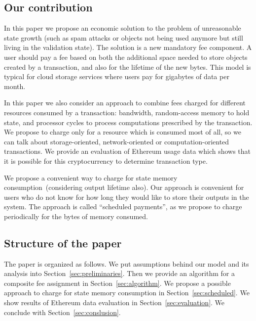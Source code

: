 \documentclass[]{llncs}   %
\begin{document}
\subsection{Our contribution}

In this paper we propose an economic solution to the problem of unreasonable state growth
(such as spam attacks or objects not being used anymore but still living in
the validation state). The solution is a new mandatory fee component. A 
user should pay a fee based on both the additional space needed to store objects
created by a transaction, and also for  the lifetime of the new bytes. This model is
typical for cloud storage services where users pay for gigabytes of data per
month. 

In this paper we also consider an approach to combine fees charged for different resources consumed by a transaction:
bandwidth, random-access memory to hold state, and processor cycles to process computations prescribed by the transaction.    
We propose to charge only for a resource which is consumed most of all, so we can talk about storage-oriented,
network-oriented or computation-oriented transactions. We provide an evaluation of Ethereum usage data which shows
that it is possible for this cryptocurrency to determine transaction type.

We propose a convenient way to charge for state memory consumption~(considering output lifetime also).
Our approach is convenient for users who do not know for how long they would like to store their
outputs in the system. The approach is called ``scheduled payments'', as we propose to charge periodically
for the bytes of memory consumed.






\subsection{Structure of the paper}
The paper is organized as follows. We put assumptions behind our model and its analysis into Section~\ref{sec:preliminaries}. Then we provide an algorithm for a composite fee assignment in Section~\ref{sec:algorithm}. We propose a possible approach to charge for state memory consumption in Section~\ref{sec:scheduled}. We show results of Ethereum data evaluation in Section~\ref{sec:evaluation}. We conclude with Section~\ref{sec:conslusion}.
\end{document}
